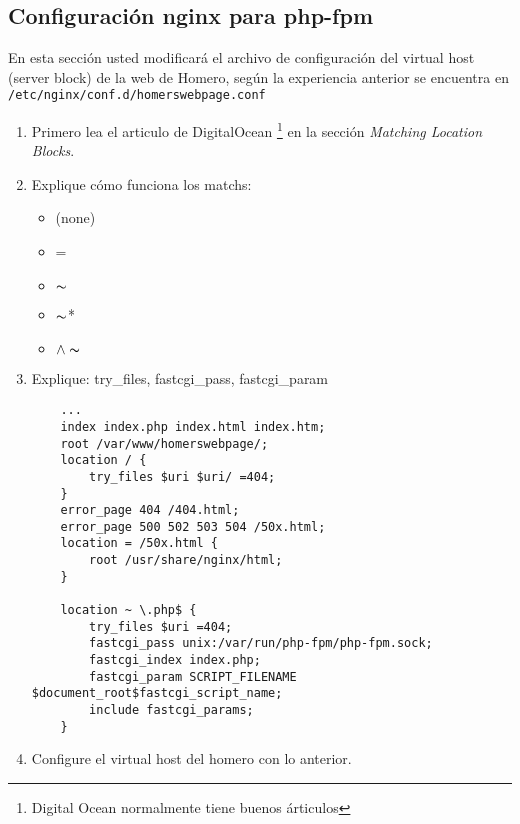 \documentclass[11pt]{exam}
\begin{document}
\subsection{Configuración nginx para php-fpm}
En esta sección usted modificará el archivo de configuración del virtual host (server block) de la web de Homero, según la experiencia anterior se encuentra en \texttt{/etc/nginx/conf.d/homerswebpage.conf}
\begin{enumerate}
	\item Primero lea el articulo de DigitalOcean \footnote{Digital Ocean normalmente tiene buenos árticulos} en la sección \textit{Matching Location Blocks}.
	\item Explique cómo funciona los matchs:
	\begin{itemize}
		\item (none)
		\item =
		\item $\thicksim$
		\item $\thicksim$*
		\item $\wedge\thicksim$
	\end{itemize}
	\newpage
	\item Explique: try\_files, fastcgi\_pass, fastcgi\_param
	\begin{lstlisting}
	...
    index index.php index.html index.htm;
    root /var/www/homerswebpage/;
    location / {
        try_files $uri $uri/ =404;
    }
    error_page 404 /404.html;
    error_page 500 502 503 504 /50x.html;
    location = /50x.html {
        root /usr/share/nginx/html;
    }

    location ~ \.php$ {
        try_files $uri =404;
        fastcgi_pass unix:/var/run/php-fpm/php-fpm.sock;
        fastcgi_index index.php;
        fastcgi_param SCRIPT_FILENAME $document_root$fastcgi_script_name;
        include fastcgi_params;
    }
	\end{lstlisting}
	\vspace{3.5in}
	\item Configure el virtual host del homero con lo anterior.
\end{enumerate}
\end{document}
